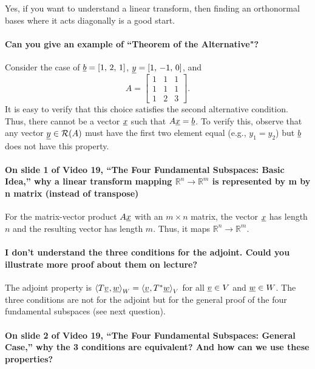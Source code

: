 \documentclass[10pt,english]{article}
\begin{document}
Yes, if you want to understand a linear transform, then finding an orthonormal bases where it acts diagonally is a good start.

\paragraph{Can you give an example of “Theorem of the Alternative"?}

Consider the case of $\underline{b} = [1,\,2,\,1]$, $\underline{y} = [1,\,-1,\,0]$, and
\[ A = \begin{bmatrix} 1 & 1 & 1 \\ 1 & 1 & 1 \\ 1 & 2 & 3 \end{bmatrix}. \]
It is easy to verify that this choice satisfies the second alternative condition.
Thus, there cannot be a vector $\underline{x}$ such that $A \underline{x} = \underline{b}$.
To verify this, observe that any vector $\underline{y} \in \mathcal{R}(A)$ must have the first two element equal (e.g., $y_1 = y_2$) but $\underline{b}$ does not have this property.


\paragraph{On slide 1 of Video 19, ``The Four Fundamental Subspaces: Basic Idea,'' why a linear transform mapping $\mathbb{R}^n \to \mathbb{R}^m$ is represented by m by n matrix (instead of transpose)}

For the matrix-vector product $A \underline{x}$ with an $m \times n$ matrix, the vector $\underline{x}$ has length $n$ and the resulting vector has length $m$.
Thus, it maps $\mathbb{R}^n \to \mathbb{R}^m$.

\paragraph{I don't understand the three conditions for the adjoint.  Could you illustrate more proof about them on lecture?}

The adjoint property is ${\langle  T \underline{v}  \mskip1mu ,  \underline{w}  \rangle}_W = {\langle  \underline{v}  \mskip1mu ,  T^* \underline{w}  \rangle}_V$ for all $\underline{v} \in V$ and $\underline{w} \in W$.
The three conditions are not for the adjoint but for the general proof of the four fundamental subspaces (see next question).


\paragraph{On slide 2 of Video 19, ``The Four Fundamental Subspaces: General Case,'' why the 3 conditions are equivalent? And how can we use these properties?}
\end{document}
